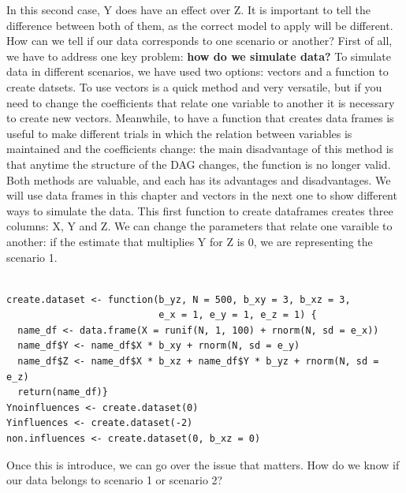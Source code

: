 \documentclass{article}
\begin{document}
In this second case, Y does have an effect over Z.
It is important to tell the difference between both of them, as the correct model to apply will be different. How can we tell if our data corresponds to one scenario or another?
First of all, we have to address one key problem: \textbf{how do we simulate data?}
To simulate data in different scenarios, we have used two options: vectors and a function to create datsets. To use vectors is a quick method and very versatile, but if you need to change the coefficients that relate one variable to another it is necessary to create new vectors. Meanwhile, to have a function that creates data frames is useful to make different trials in which the relation between variables is maintained and the coefficients change: the main disadvantage of this method is that anytime the structure of the DAG changes, the function is no longer valid. Both methods are valuable, and each has its advantages and disadvantages. We will use data frames in this chapter and vectors in the next one to show different ways to simulate the data.
This first function to create dataframes creates three columns: X, Y and Z. We can change the parameters that relate one varaible to another: if the estimate that multiplies Y for Z is 0, we are representing the scenario 1.

\begin{lstlisting}

create.dataset <- function(b_yz, N = 500, b_xy = 3, b_xz = 3,
                           e_x = 1, e_y = 1, e_z = 1) {
  name_df <- data.frame(X = runif(N, 1, 100) + rnorm(N, sd = e_x))
  name_df$Y <- name_df$X * b_xy + rnorm(N, sd = e_y)
  name_df$Z <- name_df$X * b_xz + name_df$Y * b_yz + rnorm(N, sd = e_z)
  return(name_df)}
Ynoinfluences <- create.dataset(0)
Yinfluences <- create.dataset(-2)
non.influences <- create.dataset(0, b_xz = 0)

\end{lstlisting}

Once this is introduce, we can go over the issue that matters. How do we know if our data belongs to scenario 1 or scenario 2?
\end{document}
